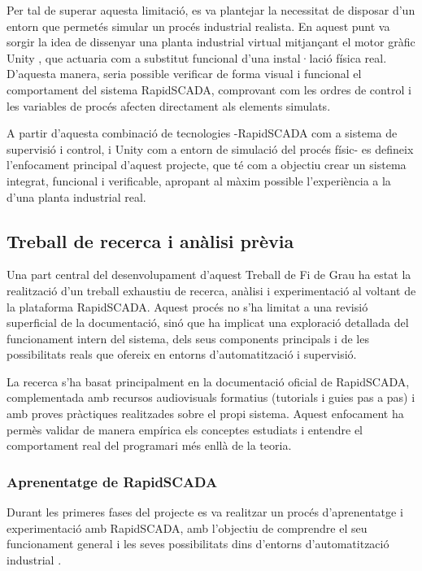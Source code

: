 \documentclass[a4paper,11pt,DIV=13,headings=normal,abstract=true,twoside=semi]{article}
\begin{document}
Per tal de superar aquesta limitació, es va plantejar la necessitat de disposar d'un entorn que permetés simular un procés industrial realista. En aquest punt va sorgir la idea de dissenyar una planta industrial virtual mitjançant el motor gràfic Unity \cite{Unity}, que actuaria com a substitut funcional d'una instal·lació física real. D'aquesta manera, seria possible verificar de forma visual i funcional el comportament del sistema RapidSCADA, comprovant com les ordres de control i les variables de procés afecten directament als elements simulats.


A partir d'aquesta combinació de tecnologies -RapidSCADA com a sistema de supervisió i control, i Unity com a entorn de simulació del procés físic- es defineix l'enfocament principal d'aquest projecte, que té com a objectiu crear un sistema integrat, funcional i verificable, apropant al màxim possible l'experiència a la d'una planta industrial real.

\subsection{Treball de recerca i anàlisi prèvia}
\label{sec:rapidscada_research}

Una part central del desenvolupament d'aquest Treball de Fi de Grau ha estat la realització d'un treball exhaustiu de recerca, anàlisi i experimentació al voltant de la plataforma RapidSCADA. Aquest procés no s'ha limitat a una revisió superficial de la documentació, sinó que ha implicat una exploració detallada del funcionament intern del sistema, dels seus components principals i de les possibilitats reals que ofereix en entorns d'automatització i supervisió.

La recerca s'ha basat principalment en la documentació oficial de RapidSCADA, complementada amb recursos audiovisuals formatius (tutorials i guies pas a pas) i amb proves pràctiques realitzades sobre el propi sistema. Aquest enfocament ha permès validar de manera empírica els conceptes estudiats i entendre el comportament real del programari més enllà de la teoria.

\subsubsection*{Aprenentatge de RapidSCADA}

Durant les primeres fases del projecte es va realitzar un procés d'aprenentatge i experimentació amb RapidSCADA, amb l'objectiu de comprendre el seu funcionament general i les seves possibilitats dins d'entorns d'automatització industrial \cite{RapidScada,rapidscada_intro}.
\end{document}
